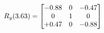 \documentclass[preview]{standalone}
\begin{document}
\begin{align*}
\special{dvisvgm:raw <g id='unique000'>}R_{y}(3.63) = \begin{bmatrix}-0.88 & 0 & -0.47 \\0 & 1 & 0 \\+0.47 & 0 & -0.88\end{bmatrix}\special{dvisvgm:raw </g>}
\end{align*}
\end{document}
